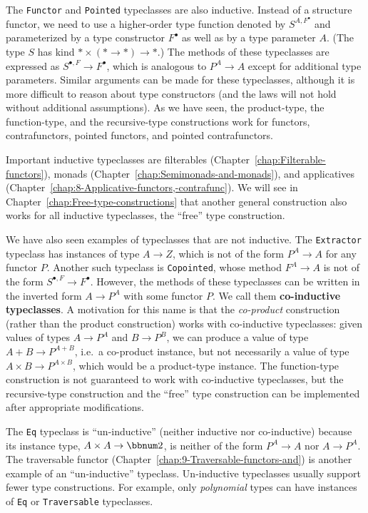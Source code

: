 The \lstinline!Functor! and \lstinline!Pointed! typeclasses are
also inductive. Instead of a structure functor, we need to use a higher-order
type function denoted by $S^{A,F^{\bullet}}$ and parameterized by
a type constructor $F^{\bullet}$ as well as by a type parameter $A$.
(The type $S$ has kind $*\times(*\rightarrow*)\rightarrow*$.) The
methods of these typeclasses are expressed as $S^{\bullet,F}\rightarrow F^{\bullet}$,
which is analogous to $P^{A}\rightarrow A$ except for additional
type parameters. Similar arguments can be made for these typeclasses,
although it is more difficult to reason about type constructors (and
the laws will not hold without additional assumptions). As we have
seen, the product-type, the function-type, and the recursive-type
constructions work for functors, contrafunctors, pointed functors,
and pointed contrafunctors.

Important inductive typeclasses are filterables (Chapter~\ref{chap:Filterable-functors}),
monads (Chapter~\ref{chap:Semimonads-and-monads}), and applicatives
(Chapter~\ref{chap:8-Applicative-functors,-contrafunc}). We will
see in Chapter~\ref{chap:Free-type-constructions} that another general
construction also works for all inductive typeclasses, \textemdash{}
the ``free'' type construction.

We have also seen examples of typeclasses that are not inductive.
The \lstinline!Extractor! typeclass has instances of type $A\rightarrow Z$,
which is not of the form $P^{A}\rightarrow A$ for any functor $P$.
Another such typeclass is \lstinline!Copointed!, whose method $F^{A}\rightarrow A$
is not of the form $S^{\bullet,F}\rightarrow F^{\bullet}$. However,
the methods of these typeclasses can be written in the inverted form
$A\rightarrow P^{A}$ with some functor $P$. We call them \textbf{co-inductive}
\textbf{typeclasses}. A motivation
for this name is that the \emph{co-product} construction (rather than
the product construction) works with co-inductive typeclasses: given
values of types $A\rightarrow P^{A}$ and $B\rightarrow P^{B}$, we
can produce a value of type $A+B\rightarrow P^{A+B}$, i.e.~a co-product
instance, but not necessarily a value of type $A\times B\rightarrow P^{A\times B}$,
which would be a product-type instance. The function-type construction
is not guaranteed to work with co-inductive typeclasses, but the recursive-type
construction and the ``free'' type construction can be implemented
after appropriate modifications.

The \lstinline!Eq! typeclass is ``un-inductive'' (neither inductive
nor co-inductive) because its instance type, $A\times A\rightarrow\bbnum 2$,
is neither of the form $P^{A}\rightarrow A$ nor $A\rightarrow P^{A}$.
The traversable functor (Chapter~\ref{chap:9-Traversable-functors-and})
is another example of an ``un-inductive'' typeclass. Un-inductive
typeclasses usually support fewer type constructions. For example,
only \emph{polynomial} types can have instances of \lstinline!Eq!
or \lstinline!Traversable! typeclasses.


